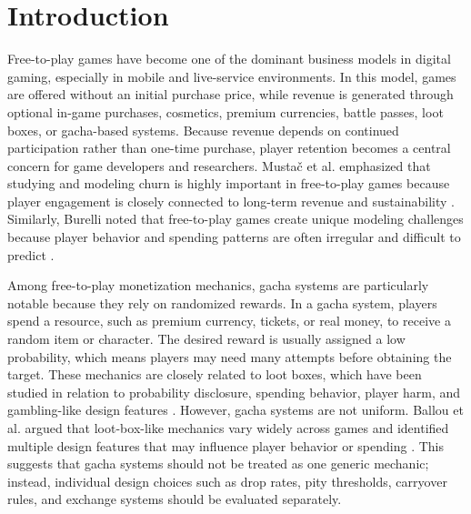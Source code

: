 \documentclass[sigconf,nonacm]{acmart}
\begin{document}
\maketitle

\section{Introduction}

Free-to-play games have become one of the dominant business models in digital gaming, especially in mobile and live-service environments. In this model, games are offered without an initial purchase price, while revenue is generated through optional in-game purchases, cosmetics, premium currencies, battle passes, loot boxes, or gacha-based systems. Because revenue depends on continued participation rather than one-time purchase, player retention becomes a central concern for game developers and researchers. Musta\v{c} et al. emphasized that studying and modeling churn is highly important in free-to-play games because player engagement is closely connected to long-term revenue and sustainability \cite{mustac2022churn}. Similarly, Burelli noted that free-to-play games create unique modeling challenges because player behavior and spending patterns are often irregular and difficult to predict \cite{burelli2022clv}.

Among free-to-play monetization mechanics, gacha systems are particularly notable because they rely on randomized rewards. In a gacha system, players spend a resource, such as premium currency, tickets, or real money, to receive a random item or character. The desired reward is usually assigned a low probability, which means players may need many attempts before obtaining the target. These mechanics are closely related to loot boxes, which have been studied in relation to probability disclosure, spending behavior, player harm, and gambling-like design features \cite{xiao2022pandora,xiao2022probability,gibson2022microtransactions,xiao2023odds}. However, gacha systems are not uniform. Ballou et al. argued that loot-box-like mechanics vary widely across games and identified multiple design features that may influence player behavior or spending \cite{ballou2022hidden}. This suggests that gacha systems should not be treated as one generic mechanic; instead, individual design choices such as drop rates, pity thresholds, carryover rules, and exchange systems should be evaluated separately.
\end{document}

